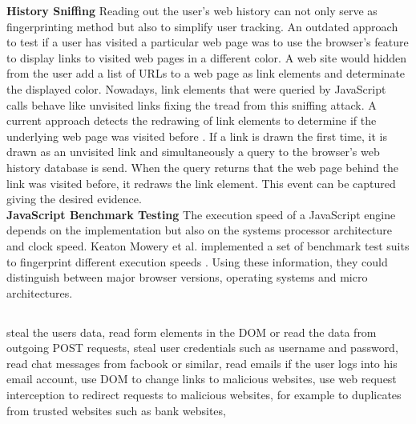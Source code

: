\documentclass[article,colorback,accentcolor=tud9c,type=bsc]{tudthesis}
\let\stdsubsection\subsection
\renewcommand\subsection{\newpage\stdsubsection}
\begin{document}
	\textbf{History Sniffing} Reading out the user's web history can not only serve as fingerprinting method but also to simplify user tracking. An outdated approach to test if a user has visited a particular web page was to use the browser's feature to display links to visited web pages in a different color. A web site would hidden from the user add a list of URLs to a web page as link elements and determinate the displayed color. Nowadays, link elements that were queried by JavaScript calls behave like unvisited links fixing the tread from this sniffing attack. A current approach detects the redrawing of link elements to determine if the underlying web page was visited before \cite{paulstone_historysniffing}. If a link is drawn the first time, it is drawn as an unvisited link and simultaneously a query to the browser's web history database is send. When the query returns that the web page behind the link was visited before, it redraws the link element. This event can be captured giving the desired evidence. \\
	
	\textbf{JavaScript Benchmark Testing} The execution speed of a JavaScript engine depends on the implementation but also on the systems processor architecture and clock
	speed. Keaton Mowery et al. implemented a set of benchmark test suits to fingerprint different execution speeds \cite{MBYS11}. Using these information, they could distinguish between major browser versions, operating systems and micro architectures. \\
	

\subsection{}
	
	steal the users data, read form elements in the DOM or read the data from outgoing POST requests, steal user credentials such as username and password, read chat messages from facbook or similar, read emails if the user logs into his email account,
	use DOM to change links to malicious websites, use web request interception to redirect requests to malicious websites, for example to duplicates from trusted websites such as bank websites, \\
\end{document}
